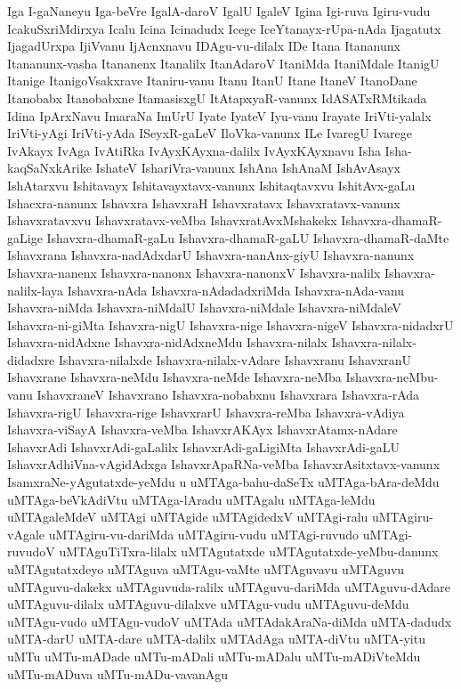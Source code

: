 {Iga
I-gaNaneyu
Iga-beVre
IgalA-daroV
IgalU
IgaleV
Igina
Igi-ruva
Igiru-vudu
IcakuSxriMdirxya
Icalu
Icina
Icinadudx
Icege
IceYtanayx-rUpa-nAda
Ijagatutx
IjagadUrxpa
IjiVvanu
IjAcnxnavu
IDAgu-vu-dilalx
IDe
Itana
Itananunx
Itananunx-vasha
Itananenx
Itanalilx
ItanAdaroV
ItaniMda
ItaniMdale
ItanigU
Itanige
ItanigoVsakxrave
Itaniru-vanu
Itanu
ItanU
Itane
ItaneV
ItanoDane
Itanobabx
Itanobabxne
ItamasisxgU
ItAtapxyaR-vanunx
IdASATxRMtikada
Idina
IpArxNavu
ImaraNa
ImUrU
Iyate
IyateV
Iyu-vanu
Irayate
IriVti-yalalx
IriVti-yAgi
IriVti-yAda
ISeyxR-gaLeV
IloVka-vanunx
ILe
IvaregU
Ivarege
IvAkayx
IvAga
IvAtiRka
IvAyxKAyxna-dalilx
IvAyxKAyxnavu
Isha
Isha-kaqSaNxkArike
IshateV
IshariVra-vanunx
IshAna
IshAnaM
IshAvAsayx
IshAtarxvu
Ishitavayx
Ishitavayxtavx-vanunx
Ishitaqtavxvu
IshitAvx-gaLu
Ishacxra-nanunx
Ishavxra
IshavxraH
Ishavxratavx
Ishavxratavx-vanunx
Ishavxratavxvu
Ishavxratavx-veMba
IshavxratAvxMshakekx
Ishavxra-dhamaR-gaLige
Ishavxra-dhamaR-gaLu
Ishavxra-dhamaR-gaLU
Ishavxra-dhamaR-daMte
Ishavxrana
Ishavxra-nadAdxdarU
Ishavxra-nanAnx-giyU
Ishavxra-nanunx
Ishavxra-nanenx
Ishavxra-nanonx
Ishavxra-nanonxV
Ishavxra-nalilx
Ishavxra-nalilx-laya
Ishavxra-nAda
Ishavxra-nAdadadxriMda
Ishavxra-nAda-vanu
Ishavxra-niMda
Ishavxra-niMdalU
Ishavxra-niMdale
Ishavxra-niMdaleV
Ishavxra-ni-giMta
Ishavxra-nigU
Ishavxra-nige
Ishavxra-nigeV
Ishavxra-nidadxrU
Ishavxra-nidAdxne
Ishavxra-nidAdxneMdu
Ishavxra-nilalx
Ishavxra-nilalx-didadxre
Ishavxra-nilalxde
Ishavxra-nilalx-vAdare
Ishavxranu
IshavxranU
Ishavxrane
Ishavxra-neMdu
Ishavxra-neMde
Ishavxra-neMba
Ishavxra-neMbu-vanu
IshavxraneV
Ishavxrano
Ishavxra-nobabxnu
Ishavxrara
Ishavxra-rAda
Ishavxra-rigU
Ishavxra-rige
IshavxrarU
Ishavxra-reMba
Ishavxra-vAdiya
Ishavxra-viSayA
Ishavxra-veMba
IshavxrAKAyx
IshavxrAtamx-nAdare
IshavxrAdi
IshavxrAdi-gaLalilx
IshavxrAdi-gaLigiMta
IshavxrAdi-gaLU
IshavxrAdhiVna-vAgidAdxga
IshavxrApaRNa-veMba
IshavxrAsitxtavx-vanunx
IsamxraNe-yAgutatxde-yeMdu
u
uMTAga-bahu-daSeTx
uMTAga-bAra-deMdu
uMTAga-beVkAdiVtu
uMTAga-lAradu
uMTAgalu
uMTAga-leMdu
uMTAgaleMdeV
uMTAgi
uMTAgide
uMTAgidedxV
uMTAgi-ralu
uMTAgiru-vAgale
uMTAgiru-vu-dariMda
uMTAgiru-vudu
uMTAgi-ruvudo
uMTAgi-ruvudoV
uMTAguTiTxra-lilalx
uMTAgutatxde
uMTAgutatxde-yeMbu-danunx
uMTAgutatxdeyo
uMTAguva
uMTAgu-vaMte
uMTAguvavu
uMTAguvu
uMTAguvu-dakekx
uMTAguvuda-ralilx
uMTAguvu-dariMda
uMTAguvu-dAdare
uMTAguvu-dilalx
uMTAguvu-dilalxve
uMTAgu-vudu
uMTAguvu-deMdu
uMTAgu-vudo
uMTAgu-vudoV
uMTAda
uMTAdakAraNa-diMda
uMTA-dadudx
uMTA-darU
uMTA-dare
uMTA-dalilx
uMTAdAga
uMTA-diVtu
uMTA-yitu
uMTu
uMTu-mADade
uMTu-mADali
uMTu-mADalu
uMTu-mADiVteMdu
uMTu-mADuva
uMTu-mADu-vavanAgu
}
